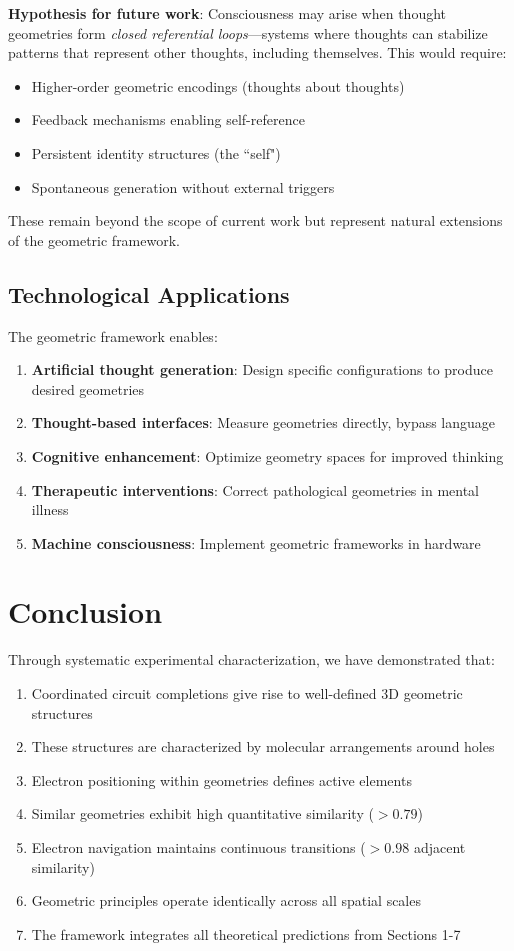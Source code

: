 \documentclass[11pt]{article}
\theoremstyle{remark}
\begin{document}
\textbf{Hypothesis for future work}: Consciousness may arise when thought geometries form \textit{closed referential loops}—systems where thoughts can stabilize patterns that represent other thoughts, including themselves. This would require:
\begin{itemize}
\item Higher-order geometric encodings (thoughts about thoughts)
\item Feedback mechanisms enabling self-reference
\item Persistent identity structures (the ``self")
\item Spontaneous generation without external triggers
\end{itemize}

These remain beyond the scope of current work but represent natural extensions of the geometric framework.

\subsection{Technological Applications}

The geometric framework enables:

\begin{enumerate}
\item \textbf{Artificial thought generation}: Design specific  configurations to produce desired geometries
\item \textbf{Thought-based interfaces}: Measure geometries directly, bypass language
\item \textbf{Cognitive enhancement}: Optimize geometry spaces for improved thinking
\item \textbf{Therapeutic interventions}: Correct pathological geometries in mental illness
\item \textbf{Machine consciousness}: Implement geometric frameworks in hardware
\end{enumerate}

\section{Conclusion}

Through systematic experimental characterization, we have demonstrated that:

\begin{enumerate}
\item Coordinated circuit completions give rise to well-defined 3D geometric structures
\item These structures are characterized by  molecular arrangements around holes
\item Electron positioning within geometries defines active elements
\item Similar geometries exhibit high quantitative similarity ($> 0.79$)
\item Electron navigation maintains continuous transitions ($> 0.98$ adjacent similarity)
\item Geometric principles operate identically across all spatial scales
\item The framework integrates all theoretical predictions from Sections 1-7
\end{enumerate}
\end{document}
